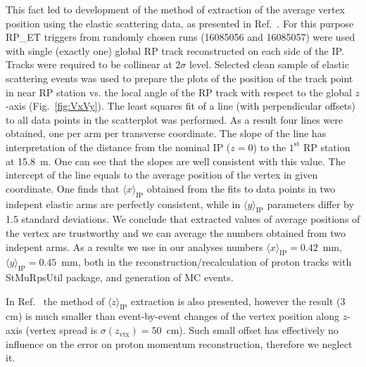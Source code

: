 This fact led to development of the method of extraction of the average vertex position using the elastic scattering data, as presented in Ref.~\cite{AverageVertex}. For this purpose RP\_ET triggers from randomly chosen runs (16085056 and 16085057) were used with single (exactly one) global RP track reconstructed on each side of the IP. Tracks were required to be collinear at 2$\sigma$ level. Selected clean sample of elastic scattering events was used to prepare the plots of the position of the track point in near RP station vs. the local angle of the RP track with respect to the global $z$-axis (Fig.~\ref{fig:VxVy}). The least squares fit of a line (with perpendicular offsets) to all data points in the scatterplot was performed. As a result four lines were obtained, one per arm per transverse coordinate. The slope of the line has interpretation of the distance from the nominal IP ($z=0$) to the $1^{\text{st}}$ RP station at 15.8~m. One can see that the slopes are well consistent with this value. The intercept of the line equals to the average position of the vertex in given coordinate. One finds that $\langle x\rangle_{\text{IP}}$ obtained from the fits to data points in two indepent elastic arms are perfectly consistent, while in $\langle y\rangle_{\text{IP}}$ parameters differ by 1.5 standard deviations. We conclude that extracted values of average positions of the vertex are trustworthy and we can average the numbers obtained from two indepent arms. As a results we use in our analyses numbers $\langle x\rangle_{\text{IP}} = 0.42$~mm, $\langle y\rangle_{\text{IP}} = 0.45$~mm, both in the reconstruction/recalculation of proton tracks with StMuRpsUtil package, and generation of MC events.

In Ref.~\cite{AverageVertex} the method of $\langle z\rangle_{\text{IP}}$ extraction is also presented, however the result (3 cm) is much smaller than event-by-event changes of the vertex position along $z$-axis (vertex spread is $\sigma(z_{\text{vtx}})=50$~cm). Such small offset has effectively no influence on the error on proton momentum reconstruction, therefore we neglect it.

